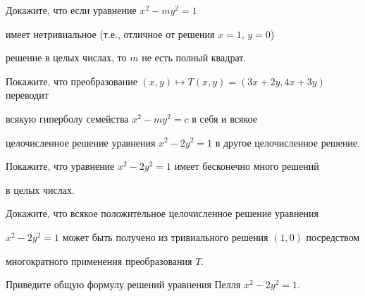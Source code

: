 \documentclass[a4paper,12pt]{article}
\begin{document}



\noindent



 Докажите, что если уравнение $x^2-my^2=1$

имеет нетривиальное (т.е., отличное от решения $x=1,\,y=0$)

решение в целых числах, то $m$ не есть полный квадрат.











%

















Покажите, что преобразование $(x,y)\mapsto T(x,y)= (3x+2y,4x+3y)$ переводит

всякую гиперболу семейства $x^2-my^2=c$ в себя и всякое

 целочисленное решение уравнения $x^2-2y^2=1$ в другое целочисленное решение.



 Покажите, что уравнение $x^2-2y^2=1$ имеет бесконечно много решений

в целых числах.



 Докажите, что всякое положительное целочисленное решение уравнения

$x^2-2y^2=1$ может быть получено из тривиального решения $(1,0)$ посредством

многократного применения преобразования $T$.




 Приведите общую формулу решений уравнения Пелля $x^2-2y^2=1$.

\end{document}
